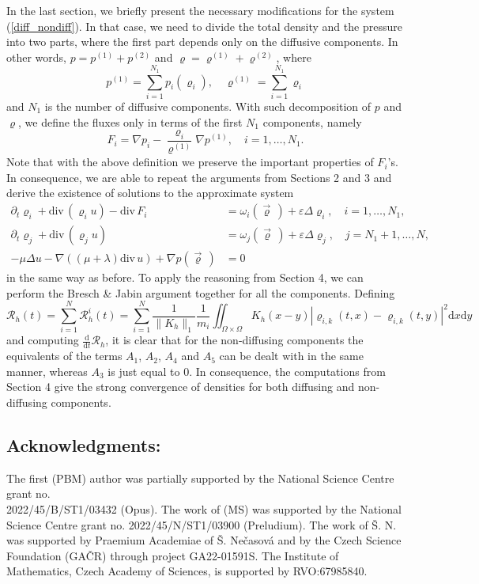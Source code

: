 \documentclass[11pt]{article}
\newcommand{\dd}{\mathrm{d}}
\newcommand{\ddiv}{\mathrm{div\,}}
\numberwithin{equation}{section}
\numberwithin{tw}{section}
\begin{document}
In the last section, we briefly present the necessary modifications for the system (\ref{diff_nondiff}). In that case, we need to divide the total density and the pressure into two parts, where the first part depends only on the diffusive components. In other words, $p=p^{(1)}+p^{(2)}$ and $\varrho=\varrho^{(1)}+\varrho^{(2)}$, where
\[ p^{(1)} = \sum_{i=1}^{N_1} p_i(\varrho_i), \quad \varrho^{(1)}=\sum_{i=1}^{N_1}\varrho_i \]
and $N_1$ is the number of diffusive components. With such decomposition of $p$ and $\varrho$, we define the fluxes only in terms of the first $N_1$ components, namely
\[ F_i = \nabla p_i - \frac{\varrho_i}{\varrho^{(1)}}\nabla p^{(1)}, \quad i=1,\ldots, N_1. \]
Note that with the above definition we preserve the important properties of $F_i$'s. In consequence, we are able to repeat the arguments from Sections 2 and 3 and derive the existence of solutions to the approximate system 
\begin{equation}\label{approx_gen}
    \begin{aligned}
    \partial_t\varrho_{i} + \ddiv(\varrho_{i} u) -\ddiv F_{i} &= \omega_{i}(\vec\varrho\,) + \varepsilon\Delta\varrho_i, \quad i=1,\dots,N_1 ,\\
    \partial_t\varrho_j + \ddiv(\varrho_ju) &= \omega_j(\vec\varrho\,) + \varepsilon\Delta\varrho_j, \quad j=N_1+1,\dots, N, \\
   -\mu\Delta u -\nabla((\mu+\lambda)\ddiv u) + \nabla p(\vec\varrho\,) &= 0
    \end{aligned}
\end{equation}
in the same way as before. To apply the reasoning from Section 4, we can perform the Bresch \& Jabin argument together for all the components. Defining
\[ \mathcal{R}_h(t) = \sum_{i=1}^N\mathcal{R}_h^i(t) = \sum_{i=1}^N\frac{1}{\|K_h\|_1}\frac{1}{m_i}\iint_{\Omega\times\Omega} K_h(x-y)|\varrho_{i,k}(t,x)-\varrho_{i,k}(t,y)|^2\dd x\dd y \]
and computing $\frac{\dd}{\dd t}\mathcal{R}_h$, it is clear that for the non-diffusing components the equivalents of the terms $A_1$, $A_2$, $A_4$ and $A_5$ can be dealt with in the same manner, whereas $A_3$ is just equal to $0$. In consequence, the computations from Section 4 give the strong convergence of densities for both diffusing and non-diffusing components. 

\subsection* {Acknowledgments:}
 The first (PBM)  author was partially supported by the National Science Centre grant no.  \\ 2022/45/B/ST1/03432 (Opus). The work of (MS) was supported by the National Science Centre grant no. 2022/45/N/ST1/03900 (Preludium). The work of \v S. N. was supported by Praemium Academiae of \v S. Ne\v casov\' a and by the Czech Science Foundation (GA\v CR) through project GA22-01591S. The Institute of Mathematics, Czech Academy of Sciences, is supported by RVO:67985840.
\end{document}
